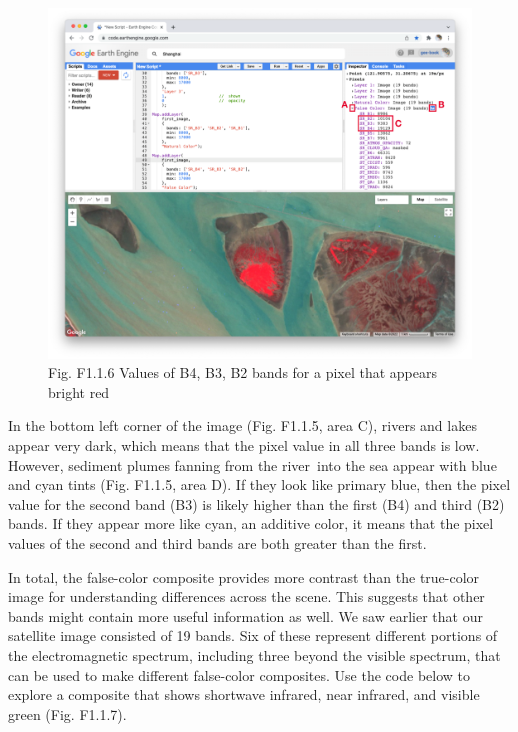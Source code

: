 \documentclass[
  letterpaper,
  DIV=11,
  numbers=noendperiod]{scrreprt}
\begin{document}
\begin{figure}

{\centering \includegraphics{./F1/image22.png}

}

\caption{Fig. F1.1.6 Values of B4, B3, B2 bands for a pixel that appears
bright red}

\end{figure}

In the bottom left corner of the image (Fig. F1.1.5, area C), rivers and
lakes appear very dark, which means that the pixel value in all three
bands is low. However, sediment plumes fanning from the river~into the
sea appear with blue and cyan tints (Fig. F1.1.5, area D). If they look
like primary blue, then the pixel value for the second band (B3) is
likely higher than the first (B4) and third (B2) bands. If they appear
more like cyan, an additive color, it means that the pixel values of the
second and third bands are both greater than the first.

In total, the false-color composite provides more contrast than the
true-color image for understanding differences across the scene. This
suggests that other bands might contain more useful information as well.
We saw earlier that our satellite image consisted of 19 bands. Six of
these represent different portions of the electromagnetic spectrum,
including three beyond the visible spectrum, that can be used to make
different false-color composites. Use the code below to explore a
composite that shows shortwave infrared, near infrared, and visible
green (Fig. F1.1.7). ~
\end{document}
